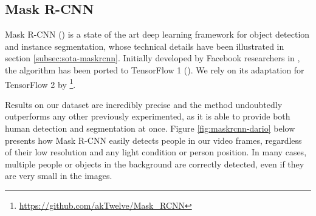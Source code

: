 



\subsection{Mask R-CNN}
\label{subsec:masking-maskrcnn}

Mask R-CNN (\cite{he2018mask}) is a state of the art deep learning framework for object detection and instance segmentation, whose technical details have been illustrated in section \ref{subsec:sota-maskrcnn}. Initially developed by Facebook researchers in \cite{pytorch}, the algorithm has been ported to TensorFlow 1 (\cite{MaskRCNN_matterport}). We rely on its adaptation for TensorFlow 2 by \cite{MaskRCNN_akTwelve}\footnote{\url{https://github.com/akTwelve/Mask_RCNN}}.

\medskip

Results on our dataset are incredibly precise and the method undoubtedly outperforms any other previously experimented, as it is able to provide both human detection and segmentation at once. Figure \ref{fig:maskrcnn-dario} below presents how Mask R-CNN easily detects people in our video frames, regardless of their low resolution and any light condition or person position. In many cases, multiple people or objects in the background are correctly detected, even if they are very small in the images.

